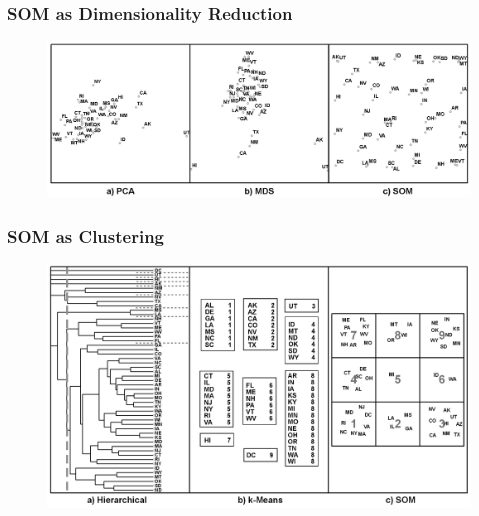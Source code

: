 \documentclass[nototal,handout]{beamer}
\begin{document}
\begin{frame}
	\frametitle{SOM as Dimensionality Reduction}
  \begin{center}
  \begin{figure}
  \includegraphics[width=0.90\linewidth]{dimensionReduction.png}
  \end{figure}
  \end{center}
 \end{frame} 

\begin{frame}
	\frametitle{SOM as Clustering}
  \begin{center}
  \begin{figure}
  \includegraphics[width=0.90\linewidth]{clustering.png}
  \end{figure}
  \end{center}
 \end{frame} 


\section{} 
\end{document}
